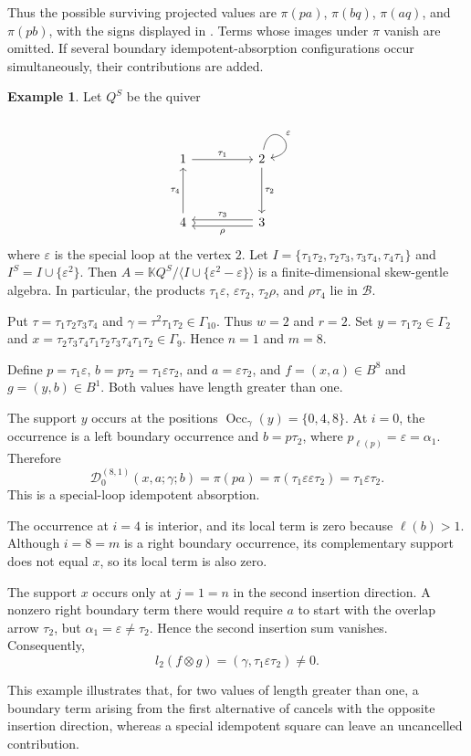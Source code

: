\documentclass[11pt,a4paper,reqno]{amsart}
\newcommand{\mK}{\mathbb K}
\newcommand{\mB}{\mathcal B}
\newcommand{\mD}{\mathcal D}
\newcommand{\Occ}{\operatorname{Occ}}
\newcommand{\para}[2]{(#1,#2)}
\newcommand{\ep}{\varepsilon}
\theoremstyle{plain}
\theoremstyle{definition}
\newtheorem{example}[example]{Example}
\numberwithin{equation}{section}
\begin{document}
	Thus the possible surviving projected values are $\pi(pa)$, $\pi(bq)$, $\pi(aq)$, and $\pi(pb)$,
	with the signs displayed in
	.  Terms whose images under $\pi$ vanish
	are omitted.  If several boundary idempotent-absorption configurations occur
	simultaneously, their contributions are added.
	\begin{example}
		\label{ex:suffix-long-value-absorption}
		Let $Q^S$ be the quiver
		\[
		\begin{tikzcd}
			1 && 2 \\
			\\
			4 && 3
			\arrow["{\tau_1}", from=1-1, to=1-3]
			\arrow["\ep", from=1-3, to=1-3,
			loop, in=10, out=80, distance=10mm]
			\arrow["{\tau_2}", from=1-3, to=3-3]
			\arrow["{\tau_4}", from=3-1, to=1-1]
			\arrow["{\tau_3}"', shift right, from=3-3, to=3-1]
			\arrow["\rho", shift left, from=3-3, to=3-1]
		\end{tikzcd}
		\]
		where $\ep$ is the special loop at the vertex $2$.  Let
		$I=\{\tau_1\tau_2, \tau_2\tau_3, \tau_3\tau_4, \tau_4\tau_1\}$ and
		$I^S=I\cup\{\ep^2\}$.
		Then
		$A= \mK Q^S/ \langle I\cup\{\ep^2-\ep\}\rangle$
		is a finite-dimensional skew-gentle algebra.  In particular, the products
		$\tau_1\ep$, $\ep\tau_2$, $\tau_2\rho$, and $\rho\tau_4$ lie in $\mB$.
		
		Put
		$\tau=\tau_1\tau_2\tau_3\tau_4$
		and
		$\gamma=\tau^2\tau_1\tau_2\in\Gamma_{10}$.
		Thus
		$w=2$ and $r=2$.
		Set
		$y=\tau_1\tau_2\in\Gamma_2$
		and
		$x= \tau_2\tau_3\tau_4\tau_1 \tau_2\tau_3\tau_4\tau_1\tau_2 \in\Gamma_9$.
		Hence
		$n=1$ and $m=8$.
		
		Define
		$p=\tau_1\ep$, $b=p\tau_2=\tau_1\ep\tau_2$, and $a=\ep\tau_2$,
		and
		$f=\para{x}{a}\in B^8$ and $g=\para{y}{b}\in B^1$.
		Both values have length greater than one.
		
		The support $y$ occurs at the positions
		$\Occ_\gamma(y)=\{0,4,8\}$.
		At $i=0$, the occurrence is a left boundary occurrence and
		$b=p\tau_2$, where $p_{\ell(p)}=\ep=\alpha_1$.
		Therefore
		\[\mD_0^{(8,1)}(x,a;\gamma;b)=\pi(pa)=\pi(\tau_1\ep\ep\tau_2)=\tau_1\ep\tau_2.\]
		This is a special-loop idempotent absorption.
		
		The occurrence at $i=4$ is interior, and its local term is zero because
		$\ell(b)>1$.
		Although $i=8=m$ is a right boundary occurrence, its complementary
		support does not equal $x$, so its local term is also zero.
		
		The support $x$ occurs only at $j=1=n$ in the second insertion
		direction.  A nonzero right boundary term there would require $a$ to
		start with the overlap arrow $\tau_2$, but
		$\alpha_1=\ep\neq\tau_2$.
		Hence the second insertion sum vanishes.  Consequently,
		\[
		l_2(f\otimes g)
		=
		\para{\gamma}{\tau_1\ep\tau_2}
		\neq0.
		\]
		
		This example illustrates that, for two values of length greater than one,
		a boundary term arising from the first alternative of
		 cancels with the opposite insertion
		direction, whereas a special idempotent square can leave an uncancelled
		contribution.
	\end{example}
\end{document}
